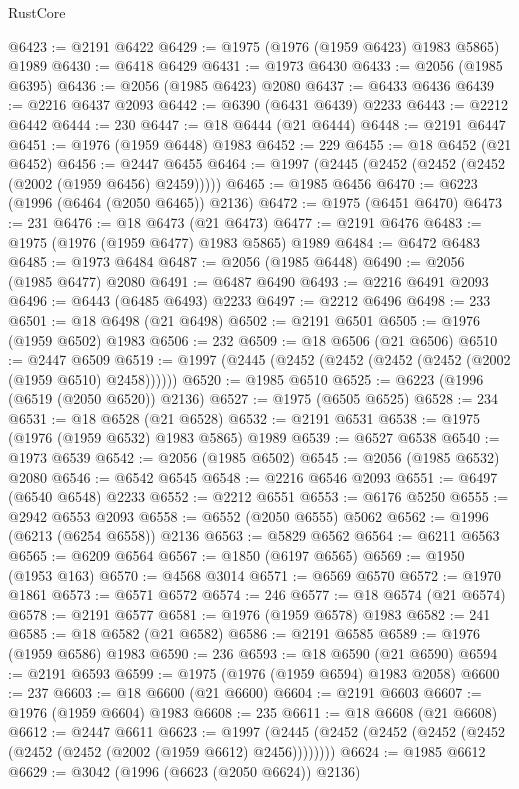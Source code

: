 \begin{lexlean}{RustCore}
\begin{coremodule}
@6423 := @2191 @6422
@6429 := @1975 (@1976 (@1959 @6423) @1983 @5865) @1989
@6430 := @6418 @6429
@6431 := @1973 @6430
@6433 := @2056 (@1985 @6395)
@6436 := @2056 (@1985 @6423) @2080
@6437 := @6433 @6436
@6439 := @2216 @6437 @2093
@6442 := @6390 (@6431 @6439) @2233
@6443 := @2212 @6442
@6444 := 230
@6447 := @18 @6444 (@21 @6444)
@6448 := @2191 @6447
@6451 := @1976 (@1959 @6448) @1983
@6452 := 229
@6455 := @18 @6452 (@21 @6452)
@6456 := @2447 @6455
@6464 := @1997 (@2445 (@2452 (@2452 (@2452 (@2002 (@1959 @6456) @2459)))))
@6465 := @1985 @6456
@6470 := @6223 (@1996 (@6464 (@2050 @6465)) @2136)
@6472 := @1975 (@6451 @6470)
@6473 := 231
@6476 := @18 @6473 (@21 @6473)
@6477 := @2191 @6476
@6483 := @1975 (@1976 (@1959 @6477) @1983 @5865) @1989
@6484 := @6472 @6483
@6485 := @1973 @6484
@6487 := @2056 (@1985 @6448)
@6490 := @2056 (@1985 @6477) @2080
@6491 := @6487 @6490
@6493 := @2216 @6491 @2093
@6496 := @6443 (@6485 @6493) @2233
@6497 := @2212 @6496
@6498 := 233
@6501 := @18 @6498 (@21 @6498)
@6502 := @2191 @6501
@6505 := @1976 (@1959 @6502) @1983
@6506 := 232
@6509 := @18 @6506 (@21 @6506)
@6510 := @2447 @6509
@6519 := @1997 (@2445 (@2452 (@2452 (@2452 (@2452 (@2002 (@1959 @6510) @2458))))))
@6520 := @1985 @6510
@6525 := @6223 (@1996 (@6519 (@2050 @6520)) @2136)
@6527 := @1975 (@6505 @6525)
@6528 := 234
@6531 := @18 @6528 (@21 @6528)
@6532 := @2191 @6531
@6538 := @1975 (@1976 (@1959 @6532) @1983 @5865) @1989
@6539 := @6527 @6538
@6540 := @1973 @6539
@6542 := @2056 (@1985 @6502)
@6545 := @2056 (@1985 @6532) @2080
@6546 := @6542 @6545
@6548 := @2216 @6546 @2093
@6551 := @6497 (@6540 @6548) @2233
@6552 := @2212 @6551
@6553 := @6176 @5250
@6555 := @2942 @6553 @2093
@6558 := @6552 (@2050 @6555) @5062
@6562 := @1996 (@6213 (@6254 @6558)) @2136
@6563 := @5829 @6562
@6564 := @6211 @6563
@6565 := @6209 @6564
@6567 := @1850 (@6197 @6565)
@6569 := @1950 (@1953 @163)
@6570 := @4568 @3014
@6571 := @6569 @6570
@6572 := @1970 @1861
@6573 := @6571 @6572
@6574 := 246
@6577 := @18 @6574 (@21 @6574)
@6578 := @2191 @6577
@6581 := @1976 (@1959 @6578) @1983
@6582 := 241
@6585 := @18 @6582 (@21 @6582)
@6586 := @2191 @6585
@6589 := @1976 (@1959 @6586) @1983
@6590 := 236
@6593 := @18 @6590 (@21 @6590)
@6594 := @2191 @6593
@6599 := @1975 (@1976 (@1959 @6594) @1983 @2058)
@6600 := 237
@6603 := @18 @6600 (@21 @6600)
@6604 := @2191 @6603
@6607 := @1976 (@1959 @6604) @1983
@6608 := 235
@6611 := @18 @6608 (@21 @6608)
@6612 := @2447 @6611
@6623 := @1997 (@2445 (@2452 (@2452 (@2452 (@2452 (@2452 (@2452 (@2002 (@1959 @6612) @2456))))))))
@6624 := @1985 @6612
@6629 := @3042 (@1996 (@6623 (@2050 @6624)) @2136)

\end{coremodule}
\end{lexlean}
